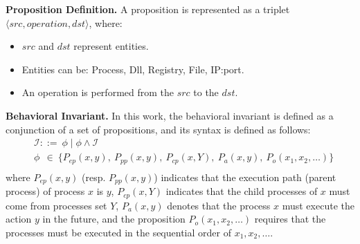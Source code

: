 

\noindent
{\bf Proposition Definition.}
A proposition is represented as a triplet $\langle src, operation, dst\rangle$, where:
\begin{itemize}
    \item $src$ and $dst$ represent entities.
    \item Entities can be: Process, Dll, Registry, File, IP:port.
    \item An operation is performed from the $src$ to the $dst$.
\end{itemize}

\noindent
{\bf Behavioral Invariant.} In this work, the behavioral invariant is defined as a conjunction of a set of propositions, and its syntax is defined as follows:
\begin{align*}
 & \mathcal{I}  ::= \ \phi \mid \phi \wedge \mathcal{I} \\
 & \phi  \ \ \in \ \{ P_{ep}(x,y), \ P_{pp}(x,y), \ P_{cp}(x,Y), \ P_{a}(x,y), \ P_{o}(x_1,x_2,\ldots)\} \\
\end{align*}
where $P_{ep}(x,y)$ (resp. $P_{pp}(x,y)$) indicates that the execution path (parent process) of process $x$ is $y$, $P_{cp}(x, Y)$ indicates that the child processes of $x$ must come from processes set $Y$, $P_{a}(x,y)$ denotes that the process $x$ must execute the action $y$ in the future, and the proposition $P_{o}(x_1,x_2,\ldots)$ requires that the processes must be executed in the sequential order of $x_1,x_2,\ldots$.

